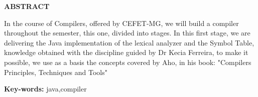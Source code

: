 \begin{center}
\uppercase{\textbf{\large{Abstract}}}
\end{center}

In the course of Compilers, offered by CEFET-MG, we will build a compiler throughout the semester, this one, divided into stages. In this first stage, we are delivering the Java implementation of the lexical analyzer and the Symbol Table, knowledge obtained with the discipline guided by Dr Kecia Ferreira, to make it possible, we use as a basis the concepts covered by Aho, in his book: "Compilers Principles, Techniques and Tools"
\vspace{5cm}

\textbf{Key-words:} java,compiler

\clearpage